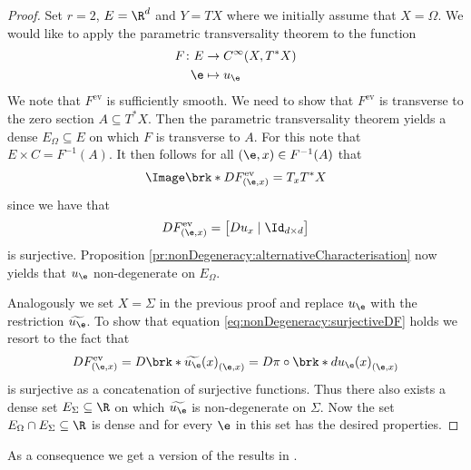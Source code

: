 \begin{proof}
  Set $r=2$, $E=\R^d$ and $Y=TX$ where we initially assume that $X=\Omega$.
  We would like to apply the parametric transversality theorem to the function
  \begin{align*}
    F\colon E&\to C^\infty(X,T^*X) \\
    \e&\mapsto u_\e
  \end{align*}
  We note that $F^\text{ev}$ is sufficiently smooth. 
  We need to show that $F^\text{ev}$ is transverse to the
  zero section $A\subseteq T^*X$. Then the parametric transversality theorem 
  yields a dense $E_\Omega\subseteq E$ on which
  $F$ is transverse to $A$.
  For this note that $E\times C = F^{-1}(A)$.
  It then follows for all $(\e,x)\in F^{-1}(A)$ that
  \begin{align}
    \Image\brk*{DF^\text{ev}_{(\e,x)}}=T_xT^*X\label{eq:nonDegeneracy:surjectiveDF}
  \end{align}
  since we have that
  \begin{align*}
    DF^\text{ev}_{(\e,x)}=\begin{bmatrix}
      Du_x\mid \Id_{d\times d}
    \end{bmatrix}
  \end{align*}
  is surjective. 
  Proposition \ref{pr:nonDegeneracy:alternativeCharacterisation}
  now yields that $u_\e$ non-degenerate on $E_\Omega$.
  
  Analogously we set $X=\Sigma$ in the previous proof and replace
  $u_\e$ with the restriction $\widetilde{u_\e}$. To show that 
  equation \eqref{eq:nonDegeneracy:surjectiveDF} holds we resort to the fact that
  \begin{align*}
    DF^\text{ev}_{(\e,x)}
    =D\brk*{\widetilde{u_\e}(x)}_{(\e,x)}
    =D\pi\circ \brk*{du_\e(x)}_{(\e,x)}
  \end{align*}
  is surjective as a concatenation of surjective functions.
  Thus there also exists a dense set $E_\Sigma\subseteq\R$ on which $\widetilde{u_\e}$ is
  non-degenerate on $\Sigma$. Now the set $E_\Omega\cap E_\Sigma\subseteq\R$ is dense and
  for every $\e$ in this set has the desired properties.
\end{proof}

As a consequence we get a version of the results in \cite[§2]{Morse1970}.

